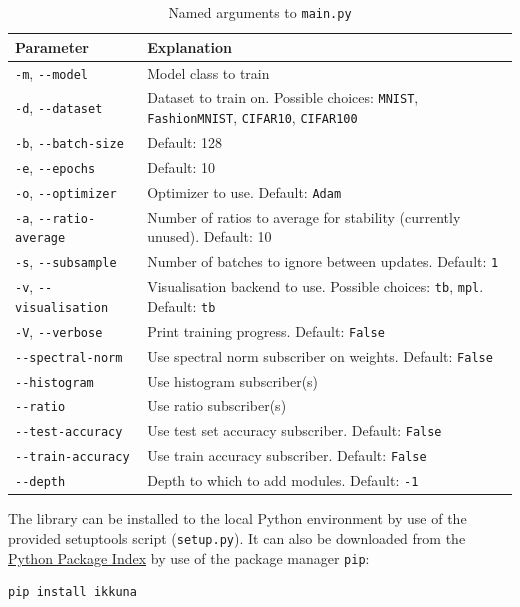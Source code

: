 \begin{table}
    \caption{Named arguments to \texttt{main.py}}
    \begin{tabularx}{\linewidth}{lX}
        \toprule
        Parameter                                   & Explanation\tabularnewline
        \midrule
        \lstinline{-m}, \lstinline{--model}         & Model class to train\tabularnewline
        \lstinline{-d}, \lstinline{--dataset}       & Dataset to train on. Possible choices: \lstinline{MNIST}, \lstinline{FashionMNIST}, \lstinline{CIFAR10}, \lstinline{CIFAR100}\tabularnewline
        \lstinline{-b}, \lstinline{--batch-size}    & Default: 128\tabularnewline
        \lstinline{-e}, \lstinline{--epochs}        & Default: 10\tabularnewline
        \lstinline{-o}, \lstinline{--optimizer}     & Optimizer to use. Default: \lstinline{Adam}\tabularnewline
        \lstinline{-a}, \lstinline{--ratio-average} & Number of ratios to average for stability (currently unused). Default: 10\tabularnewline
        \lstinline{-s}, \lstinline{--subsample}     & Number of batches to ignore between updates. Default: \lstinline{1}\tabularnewline
        \lstinline{-v}, \lstinline{--visualisation} & Visualisation backend to use. Possible choices: \lstinline{tb}, \lstinline{mpl}. Default: \lstinline{tb}\tabularnewline
        \lstinline{-V}, \lstinline{--verbose}       & Print training progress. Default: \lstinline{False}\tabularnewline
        \lstinline{--spectral-norm}                 & Use spectral norm subscriber on weights. Default: \lstinline{False}\tabularnewline
        \lstinline{--histogram}                     & Use histogram subscriber(s)\tabularnewline
        \lstinline{--ratio}                         & Use ratio subscriber(s)\tabularnewline
        \lstinline{--test-accuracy}                 & Use test set accuracy subscriber. Default: \lstinline{False}\tabularnewline
        \lstinline{--train-accuracy}                & Use train accuracy subscriber. Default: \lstinline{False}\tabularnewline
        \lstinline{--depth}                         & Depth to which to add modules.  Default: \lstinline{-1}\tabularnewline
        \bottomrule
    \end{tabularx}
\end{table}

The library can be installed to the local Python environment by use of the
provided setuptools script (\texttt{setup.py}). It can also be downloaded from
the \href{https://pypi.org/}{Python Package Index} by use of the package manager
\texttt{pip}:
\begin{lstlisting}[language=Python]
pip install ikkuna
\end{lstlisting}

